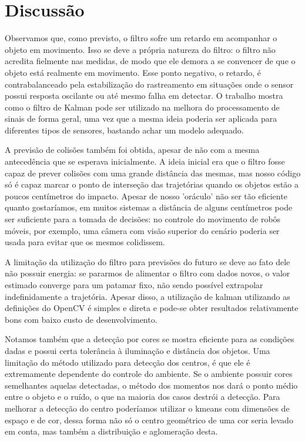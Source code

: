 \documentclass[journal]{IEEEtran}
\begin{document}
\section{Discussão}

Observamos que, como previsto, o filtro sofre um retardo em acompanhar
o objeto em movimento. Isso se deve a própria natureza do filtro: o filtro
não acredita fielmente nas medidas, de modo que ele demora a se convencer de 
que o objeto está realmente em movimento. Esse ponto negativo, o retardo, é
contrabalanceado pela estabilização do rastreamento em situações onde o 
sensor possui resposta oscilante ou até mesmo falha em detectar. O trabalho
mostra como o filtro de Kalman pode ser utilizado na melhora do processamento
de sinais de forma geral, uma vez que a mesma ideia poderia ser aplicada para
diferentes tipos de sensores, bastando achar um modelo adequado.

A previsão de colisões também foi obtida, apesar de não com a mesma
antecedência que se esperava inicialmente. A ideia inicial
era que o filtro fosse capaz de prever colisões com uma grande distância das mesmas,
mas nosso código só é capaz marcar o ponto de interseção das trajetórias
quando os objetos estão a poucos centímetros do impacto. Apesar de nosso
'oráculo' não ser tão eficiente quanto gostaríamos, em muitos sistemas a distância de
alguns centímetros pode ser suficiente para a tomada de decisões: no controle do movimento
de robôs móveis, por exemplo, uma câmera com visão superior do cenário poderia ser usada
para evitar que os mesmos colidissem. 

A limitação da utilização do filtro para previsões do futuro se deve ao fato dele
não possuir energia: se pararmos de alimentar o filtro com dados novos, o valor estimado
converge para um patamar fixo, não sendo possível extrapolar indefinidamente a
trajetória. Apesar disso, a utilização de kalman utilizando as definições do OpenCV
é simples e direta e pode-se obter resultados relativamente bons com baixo custo
de desenvolvimento.

Notamos também que  a detecção por cores se
mostra eficiente para as condições dadas
e possui certa tolerância à iluminação e distância dos objetos.
Uma limitação do método utilizado para detecção dos centros, é que ele é extremamente
dependente do controle do ambiente. Se o ambiente possuir cores semelhantes aquelas detectadas,
o método dos momentos nos dará o ponto médio entre o objeto e o ruído, o que na maioria
dos casos destrói a detecção. Para melhorar a detecção do centro poderíamos utilizar o kmeans com
dimensões de espaço e de cor, dessa forma não só o centro geométrico de uma cor seria levado em conta,
mas também a distribuição e aglomeração desta.
\end{document}
